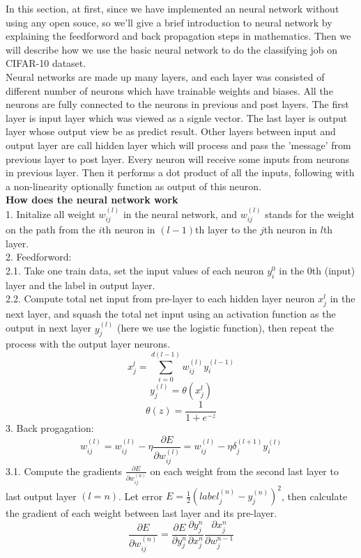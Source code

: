 \documentclass[11pt,letterpaper]{article}
\begin{document}
In this section, at first, since we have implemented an neural network without using any open souce, so we'll give a brief introduction to neural network by explaining the feedforword and back propagation steps in mathematics. Then we will describe how we use the basic neural network to do the classifying job on CIFAR-10 dataset.\\
Neural networks are made up many layers, and each layer was consisted of different number of neurons which have trainable weights and biases. All the neurons are fully connected to the neurons in previous and post layers. The first layer is input layer which was viewed as a signle vector. The last layer is output layer whose output view be as predict result. Other layers between input and output layer are call hidden layer which will process and pass the 'message' from previous layer to post layer. Every neuron will receive some inputs from neurons in previous layer. Then it performs a dot product of all the inputs, following with a non-linearity optionally function as output of this neuron. \\
{\bf How does the neural network work}\\
1. Initalize all weight $w^{(l)}_{ij}$ in the neural network, and $w^{(l)}_{ij}$ stands for the weight on the path from the $i$th neuron in $(l-1)$th layer to the $j$th neuron in $l$th layer.\\
2. Feedforword:\\
2.1. Take one train data, set the input values of each neuron $y^0_{i}$ in the $0$th (input) layer and the label in output layer.\\
2.2. Compute total net input from pre-layer to each hidden layer neuron $x^{l}_{j}$ in the next layer, and squash the total net input using an activation function as the output in next layer $y^{(l)}_{j}$ (here we use the logistic function), then repeat the process with the output layer neurons.
$$x^{l}_{j} = \sum^{d(l-1)}_{i=0}w^{(l)}_{ij}y^{(l-1)}_{i}$$
$$y^{(l)}_{j} = \theta(x^{l}_{j})$$
$$\theta(z) = \frac{1}{1+e^{-z}}$$
3. Back progagation:\\
$$w^{(l)}_{ij} = w^{(l)}_{ij} - \eta \frac{\partial E}{\partial w^{(l)}_{ij}} = w^{(l)}_{ij} - \eta \delta^{(l+1)}_{j}y^{(l)}_{i}$$
3.1. Compute the gradients $\frac{\partial E}{\partial w^{(n)}_{ij}}$ on each weight from the second last layer to last output layer $(l = n)$. Let error $E = \frac{1}{2}(label^{(n)}_{j}-y^{(n)}_{j})^2$, then calculate the gradient of each weight between last layer and its pre-layer.
$$\frac{\partial E}{\partial w^{(n)}_{ij}} = \frac{\partial E}{\partial y^{n}_{j}} \frac{\partial y^{n}_{j}}{\partial x^{n}_{j}} \frac{\partial x^{n}_{j}}{\partial w^{n-1}_{j}}$$ 
\end{document}

